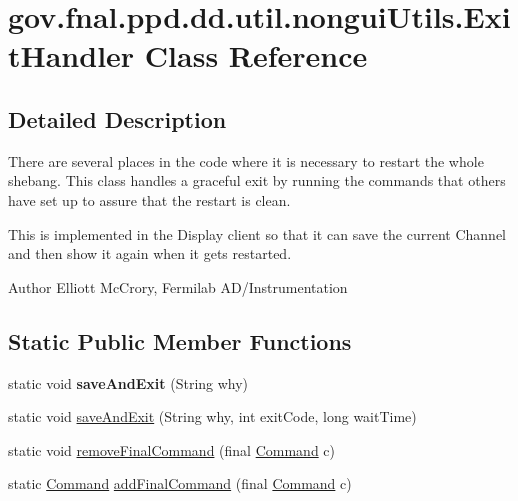 \hypertarget{classgov_1_1fnal_1_1ppd_1_1dd_1_1util_1_1nonguiUtils_1_1ExitHandler}{\section{gov.\-fnal.\-ppd.\-dd.\-util.\-nongui\-Utils.\-Exit\-Handler Class Reference}
\label{classgov_1_1fnal_1_1ppd_1_1dd_1_1util_1_1nonguiUtils_1_1ExitHandler}
}


\subsection{Detailed Description}
There are several places in the code where it is necessary to restart the whole shebang. This class handles a graceful exit by running the commands that others have set up to assure that the restart is clean.

This is implemented in the Display client so that it can save the current Channel and then show it again when it gets restarted.

\begin{DoxyAuthor}{Author}
Elliott Mc\-Crory, Fermilab A\-D/\-Instrumentation 
\end{DoxyAuthor}
\subsection*{Static Public Member Functions}
\begin{DoxyCompactItemize}
\item 
\hypertarget{classgov_1_1fnal_1_1ppd_1_1dd_1_1util_1_1nonguiUtils_1_1ExitHandler_a27e7e4bcb97555bf97af048202206e23}{static void {\bfseries save\-And\-Exit} (String why)}\label{classgov_1_1fnal_1_1ppd_1_1dd_1_1util_1_1nonguiUtils_1_1ExitHandler_a27e7e4bcb97555bf97af048202206e23}

\item 
static void \hyperlink{classgov_1_1fnal_1_1ppd_1_1dd_1_1util_1_1nonguiUtils_1_1ExitHandler_a5379acd2ff353d389bceb772a08f38d3}{save\-And\-Exit} (String why, int exit\-Code, long wait\-Time)
\item 
static void \hyperlink{classgov_1_1fnal_1_1ppd_1_1dd_1_1util_1_1nonguiUtils_1_1ExitHandler_a7869ffc2150941cbeced332cdf57df3a}{remove\-Final\-Command} (final \hyperlink{interfacegov_1_1fnal_1_1ppd_1_1dd_1_1util_1_1nonguiUtils_1_1Command}{Command} c)
\item 
static \hyperlink{interfacegov_1_1fnal_1_1ppd_1_1dd_1_1util_1_1nonguiUtils_1_1Command}{Command} \hyperlink{classgov_1_1fnal_1_1ppd_1_1dd_1_1util_1_1nonguiUtils_1_1ExitHandler_acc32a4382054c480091b42cbf3055594}{add\-Final\-Command} (final \hyperlink{interfacegov_1_1fnal_1_1ppd_1_1dd_1_1util_1_1nonguiUtils_1_1Command}{Command} c)
\end{DoxyCompactItemize}
